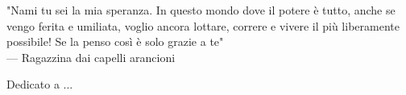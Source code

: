 \cleardoublepage
{}
\thispagestyle{empty}

\vspace*{3cm}

\begin{center}
    "Nami tu sei la mia speranza. In questo mondo dove il potere è tutto, anche se vengo ferita e umiliata, voglio ancora lottare, correre e vivere il più liberamente possibile! \newline Se la penso così è solo grazie a te" \\ \medskip
    --- Ragazzina dai capelli arancioni
\end{center}

\medskip

\begin{center}
    Dedicato a ...
\end{center}
